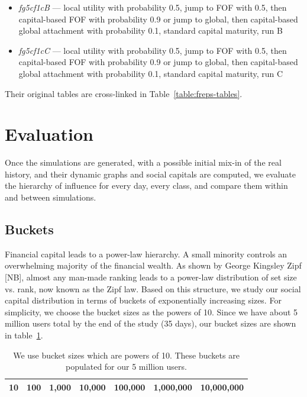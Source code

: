 \documentclass[10pt,oneside]{memoir}
\begin{document}
\begin{itemize}
\item {\itshape fg5cf1cB} --- local utility with probability 0.5, jump to FOF with 0.5, then capital-based FOF with probability 0.9 or jump to global, then capital-based global attachment with probability 0.1, standard capital maturity, run B

\item {\itshape fg5cf1cC} --- local utility with probability 0.5, jump to FOF with 0.5, then capital-based FOF with probability 0.9 or jump to global, then capital-based global attachment with probability 0.1, standard capital maturity, run C
\end{itemize}

Their original tables are cross-linked in Table~\ref{table:freps-tables}.




\pagebreak \section{Evaluation}
\label{evaluation}

Once the simulations are generated, with a possible initial mix-in of the real history, and their dynamic graphs and social capitals are computed, we evaluate the hierarchy of influence for every day, every class, and compare them within and between simulations.


\subsection{Buckets}
\label{buckets}

Financial capital leads to a power-law hierarchy.  A small minority controls an overwhelming majority of the financial wealth.  As shown by George Kingsley Zipf [NB], almost any man-made ranking leads to a power-law distribution of set size vs. rank, now known as the Zipf law.  Based on this structure, we study our social capital distribution in terms of buckets of exponentially increasing sizes.
For simplicity, we choose the bucket sizes as the powers of 10.  Since we have about 5 million users total by the end of the study (35 days), our bucket sizes are shown in table~\ref{table:bucket-sizes}.

\begin{table}
\begin{tabular}{|ccccccc|}
\toprule
10 & 100 & 1,000 & 10,000 & 100,000 & 1,000,000 & 10,000,000 \\
\bottomrule
\end{tabular}
\label{table:bucket-sizes}
\caption{We use bucket sizes which are powers of 10.  These buckets are populated for our 5 million users.}
\end{table}
\end{document}
